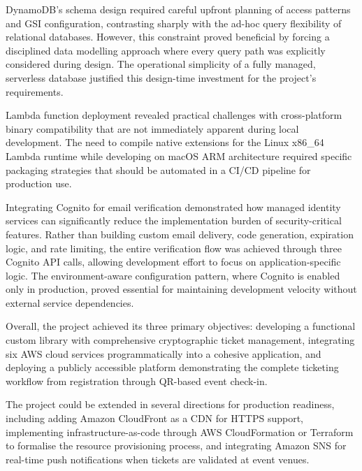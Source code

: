 \documentclass[conference]{IEEEtran}
\begin{document}
DynamoDB's schema design required careful upfront planning of access patterns and GSI configuration, contrasting sharply with the ad-hoc query flexibility of relational databases. However, this constraint proved beneficial by forcing a disciplined data modelling approach where every query path was explicitly considered during design. The operational simplicity of a fully managed, serverless database justified this design-time investment for the project's requirements.

Lambda function deployment revealed practical challenges with cross-platform binary compatibility that are not immediately apparent during local development. The need to compile native extensions for the Linux x86\_64 Lambda runtime while developing on macOS ARM architecture required specific packaging strategies that should be automated in a CI/CD pipeline for production use.

Integrating Cognito for email verification demonstrated how managed identity services can significantly reduce the implementation burden of security-critical features. Rather than building custom email delivery, code generation, expiration logic, and rate limiting, the entire verification flow was achieved through three Cognito API calls, allowing development effort to focus on application-specific logic. The environment-aware configuration pattern, where Cognito is enabled only in production, proved essential for maintaining development velocity without external service dependencies.

Overall, the project achieved its three primary objectives: developing a functional custom library with comprehensive cryptographic ticket management, integrating six AWS cloud services programmatically into a cohesive application, and deploying a publicly accessible platform demonstrating the complete ticketing workflow from registration through QR-based event check-in.

The project could be extended in several directions for production readiness, including adding Amazon CloudFront as a CDN for HTTPS support, implementing infrastructure-as-code through AWS CloudFormation or Terraform to formalise the resource provisioning process, and integrating Amazon SNS for real-time push notifications when tickets are validated at event venues.
\end{document}

